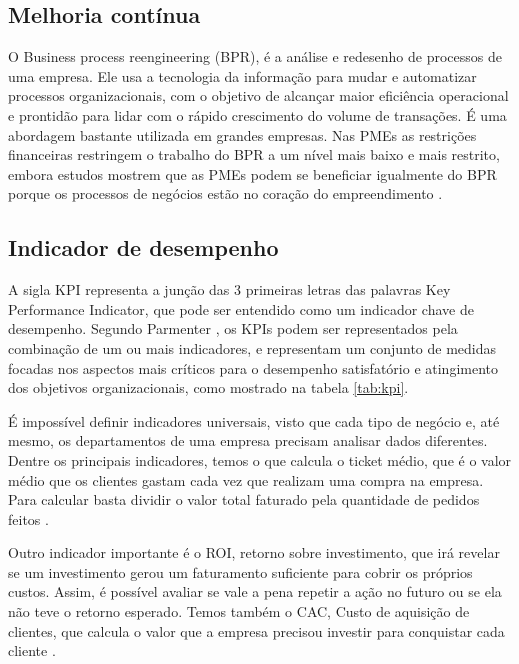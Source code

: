 \subsection{Melhoria contínua}
\label{subsec:bpr}

O Business process reengineering (BPR), é a análise e redesenho de processos de uma empresa. Ele usa a tecnologia da informação para mudar e automatizar processos organizacionais, com o objetivo de alcançar maior eficiência operacional e prontidão para lidar com o rápido crescimento do volume de transações. É uma abordagem bastante utilizada em grandes empresas. Nas PMEs as restrições financeiras restringem o trabalho do BPR a um nível mais baixo e mais restrito, embora estudos mostrem que as PMEs podem se beneficiar igualmente do BPR porque os processos de negócios estão no coração do empreendimento \cite{terc2009}.

\subsection{Indicador de desempenho}
\label{subsec:kpi}

A sigla KPI representa a junção das 3 primeiras letras das palavras Key Performance Indicator, que pode ser entendido como um indicador chave de desempenho. Segundo Parmenter \cite{parmenter}, os KPIs podem ser representados pela combinação de um ou mais indicadores, e representam um conjunto de medidas focadas nos aspectos mais críticos para o desempenho satisfatório e atingimento dos objetivos organizacionais, como mostrado na tabela \ref{tab:kpi}. 

É impossível definir indicadores universais, visto que cada tipo de negócio e, até mesmo, os departamentos de uma empresa precisam analisar dados diferentes. Dentre os principais indicadores, temos o que calcula o ticket médio, que é o valor médio que os clientes gastam cada vez que realizam uma compra na empresa. Para calcular basta dividir o valor total faturado pela quantidade de pedidos feitos \cite{locaweb2019}.

Outro indicador importante é o ROI, retorno sobre investimento, que irá revelar se um investimento gerou um faturamento suficiente para cobrir os próprios custos. Assim, é possível avaliar se vale a pena repetir a ação no futuro ou se ela não teve o retorno esperado. Temos também o CAC, Custo de aquisição de clientes, que calcula o valor que a empresa precisou investir para conquistar cada cliente \cite{locaweb2019}. 


